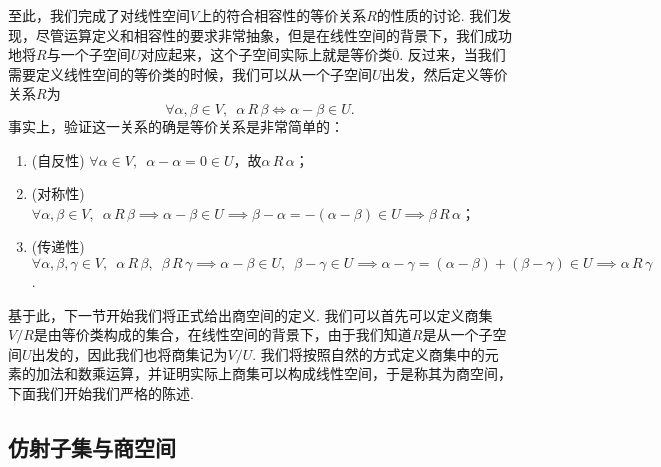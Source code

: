 至此，我们完成了对线性空间$V$上的符合相容性的等价关系$R$的性质的讨论. 我们发现，尽管运算定义和相容性的要求非常抽象，但是在线性空间的背景下，我们成功地将$R$与一个子空间$U$对应起来，这个子空间实际上就是等价类$\overline{0}$. 反过来，当我们需要定义线性空间的等价类的时候，我们可以从一个子空间$U$出发，然后定义等价关系$R$为
\begin{equation} \label{eq:10:线性空间等价关系}
    \forall\alpha,\beta\in V,\enspace\alpha\,R\,\beta\iff \alpha-\beta\in U.
\end{equation}
事实上，验证这一关系的确是等价关系是非常简单的：
\begin{enumerate}
    \item (自反性) $\forall \alpha\in V,\enspace\alpha-\alpha=0\in U$，故$\alpha\,R\,\alpha$；

    \item (对称性) $\forall \alpha,\beta\in V,\enspace\alpha\,R\,\beta\implies \alpha-\beta\in U\implies \beta-\alpha=-(\alpha-\beta)\in U\implies \beta\,R\,\alpha$；

    \item (传递性) $\forall \alpha,\beta,\gamma\in V,\enspace\alpha\,R\,\beta,\enspace\beta\,R\,\gamma\implies \alpha-\beta\in U,\enspace\beta-\gamma\in U\implies \alpha-\gamma=(\alpha-\beta)+(\beta-\gamma)\in U\implies \alpha\,R\,\gamma$.
\end{enumerate}
基于此，下一节开始我们将正式给出商空间的定义. 我们可以首先可以定义商集$V/R$是由等价类构成的集合，在线性空间的背景下，由于我们知道$R$是从一个子空间$U$出发的，因此我们也将商集记为$V/U$. 我们将按照自然的方式定义商集中的元素的加法和数乘运算，并证明实际上商集可以构成线性空间，于是称其为商空间，下面我们开始我们严格的陈述.

\subsection{仿射子集与商空间}

